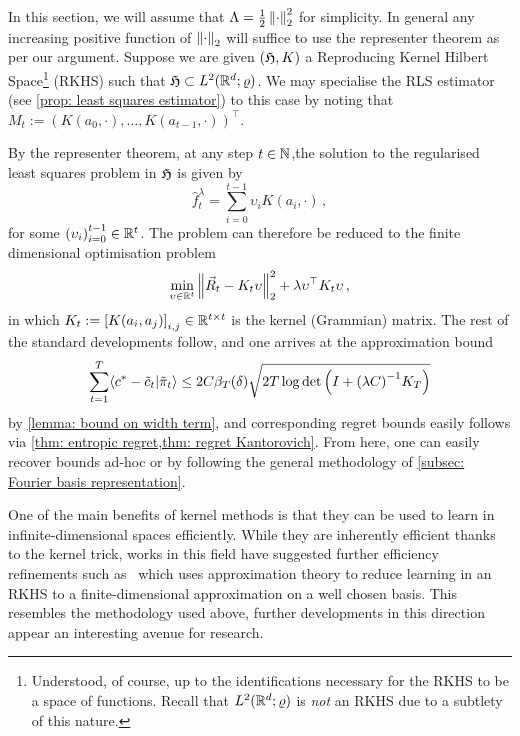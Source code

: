 In this section, we will assume that $\Lambda=\frac12\left\lVert\cdot\right\rVert^2_2$ for simplicity. In general any increasing positive function of $\left\lVert\cdot\right\rVert_2$ will suffice to use the representer theorem as per our argument. Suppose we are given $(\mathfrak{H},K)$ a Reproducing Kernel Hilbert Space\footnote{Understood, of course, up to the identifications necessary for the RKHS to be a space of functions. Recall that $L^2(\mathbb{R}^d;\varrho)$ is \emph{not} an RKHS due to a subtlety of this nature.} (RKHS) such that $\mathfrak{H}\subset L^2(\mathbb{R}^d;\varrho)$. We may specialise the RLS estimator (see \cref{prop: least squares estimator}) to this case by noting that $M_t:={(K(a_0,\cdot),\dots,K(a_{t-1},\cdot))}^\top$. 

By the representer theorem, at any step $t\in\mathbb{N}$,the solution to the regularised least squares problem in $\mathfrak{H}$ is given by
\[
    \hat f_t^\lambda = \sum_{i=0}^{t-1} \upsilon_i K(a_i,\cdot)\,,
\]
for some ${(\upsilon_i)}_{i=0}^{t-1}\in\mathbb{R}^t$. The problem can therefore be reduced to the finite dimensional optimisation problem 
\[
    \min_{\upsilon\in\mathbb{R}^t} \left\lVert\vec{R}_t - K_t\upsilon\right\rVert_2^2 + \lambda \upsilon^\top K_t\upsilon\,,
\]
in which $K_t:={[K(a_i,a_j)]}_{i,j}\in\mathbb{R}^{t\times t}$ is the kernel (Grammian) matrix. The rest of the standard developments follow, and one arrives at the approximation bound 
\[
    \sum_{t=1}^T \langle c^* - \tilde c_t\vert \tilde\pi_t\rangle \le 2C\beta_T(\delta)\sqrt{2T\log\det\left(I+{(\lambda C)}^{-1}K_T\right)}
\] 
by \cref{lemma: bound on width term}, and corresponding regret bounds easily follows via \cref{thm: entropic regret,thm: regret Kantorovich}. From here, one can easily recover bounds ad-hoc or by following the general methodology of \cref{subsec: Fourier basis representation}.

One of the main benefits of kernel methods is that they can be used to learn in infinite-dimensional spaces efficiently. While they are inherently efficient thanks to the kernel trick, works in this field have suggested further efficiency refinements such as~\cite{takemori_approximation_2021} which uses approximation theory to reduce learning in an RKHS to a finite-dimensional approximation on a well chosen basis. This resembles the methodology used above, further developments in this direction appear an interesting avenue for research. 